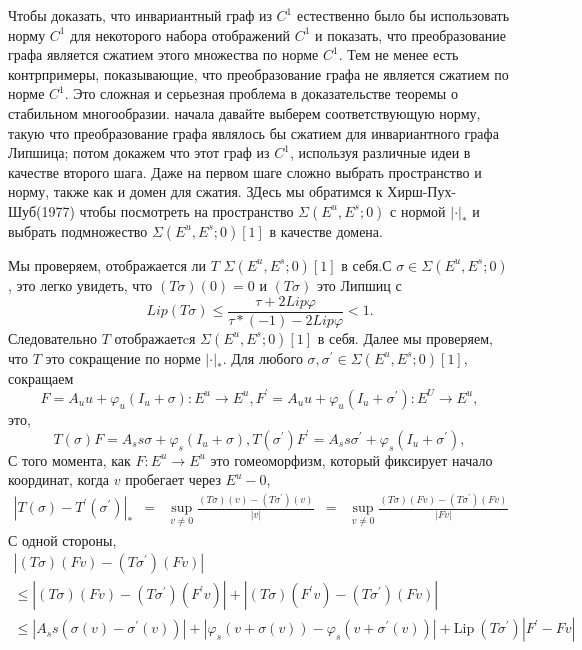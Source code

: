 \begin{demo}
\begin{remark}
Чтобы доказать, что инвариантный граф из $C^1$  естественно было бы использовать норму $C^1$ для некоторого набора отображений $C^1$ и показать, что преобразование графа является сжатием этого множества по норме $C^1$.
Тем не менее есть контрпримеры, показывающие, что преобразование графа не является сжатием по норме $C^1$. Это сложная и серьезная проблема в доказательстве теоремы о стабильном многообразии. 
начала давайте выберем соответствующую норму, такую что преобразование графа являлось бы сжатием для инвариантного графа Липшица; потом докажем что этот граф из $C^1$, используя различные идеи в качестве второго шага. Даже на первом шаге сложно выбрать пространство и норму, также как и домен для сжатия. ЗДесь мы обратимся к Хирш-Пух-Шуб(1977) чтобы посмотреть на пространство $\Sigma(E^u, E^s;0)$ с нормой $| \cdot |_*$ и выбрать подмножество $\Sigma(E^u, E^s;0)[1]$ в качестве домена.
\end{remark}
Мы проверяем, отображается ли $T$  $\Sigma(E^u,E^s;0)[1]$ в себя.С $\sigma \in \Sigma(E^u,E^s;0)$, это легко увидеть, что $(T\sigma)(0)=0$ и $(T\sigma)$ это Липшиц с
$$
Lip(T\sigma)\leqslant \frac{\tau +2Lip\varphi}{\tau*(-1) - 2Lip\varphi} < 1.
$$
Следовательно $T$ отображаетcя $\Sigma(E^u,E^s;0)[1]$ в себя.
Далее мы проверяем, что $T$ это сокращение по норме $|\cdot|_*$. Для любого $\sigma, \sigma^{\prime} \in \Sigma(E^u,E^s;0)[1]$, сокращаем
$$
F = A_uu + \varphi _u(I_u + \sigma) : E^u \rightarrow E^u,
F^{\prime} = A_uu + \varphi _u(I_u + \sigma^{\prime}) : E^U \rightarrow E^u,
$$
это,
$$
T(\sigma)F = A_ss \sigma + \varphi_s(I_u + \sigma),
T(\sigma^{\prime})F^{\prime} = A_ss \sigma^{\prime} + \varphi_s(I_u + \sigma^{\prime}),
$$
С того момента, как $F : E^u \rightarrow E^u$ это гомеоморфизм, который фиксирует начало координат, когда $v$ пробегает через $E^u - {0}$,
$$
\begin{array}{rclll}
|T(\sigma) - T^{\prime}(\sigma^{\prime})|_* &=& \sup\limits_{v \neq 0} \frac{(T\sigma)(v) - (T\sigma^{\prime})(v)}{|v|}
&=& \sup\limits_{v \neq 0} \frac{(T\sigma)(Fv) - (T\sigma^{\prime})(Fv)}{|Fv|}
\end{array}
$$
С одной стороны,
$$
\begin{array}{lclll}
|(T\sigma)(Fv) - (T\sigma^{\prime})(Fv)| \\
\leqslant |(T\sigma)(Fv) - (T\sigma^{\prime})(F^{\prime} v)| + |(T\sigma)(F^{\prime} v) - (T\sigma^{\prime})(Fv)| \\
\leqslant |A_ss(\sigma(v) - \sigma^{\prime}(v))| + |\varphi_s(v + \sigma(v)) - \varphi_s(v + \sigma^{\prime}(v))| + \mathrm{Lip} \ (T\sigma^{\prime})|F^{\prime}  - F v| \\

\end{array}$$
\end{demo}
